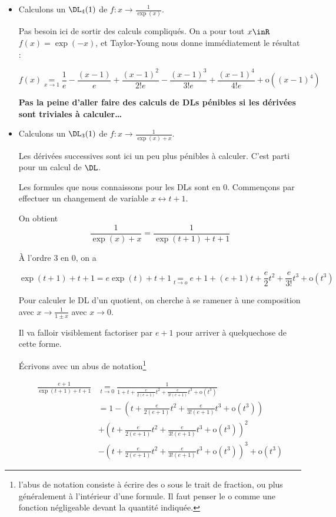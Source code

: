 \documentclass[12pt]{article}
\begin{document}
\begin{itemize}

\item Calculons un $\DL_4(1)$ de $f:x\rightarrow \frac{1}{\exp(x)}$.

Pas besoin ici de sortir des calculs compliqués. On a pour tout $x\inR$
$f(x)=\exp(-x)$, et Taylor-Young nous donne immédiatement le résultat :

$$f(x)\underset{x\rightarrow 1}{=} \frac{1}{e} - \frac{(x-1)}{e} +
\frac{(x-1)^2}{2! e}
- \frac{(x-1)^3}{3! e} +  \frac{(x-1)^4}{4! e} + \text{o}((x-1)^4) $$

\textbf{Pas la peine d'aller faire des calculs de DLs pénibles si les
  dérivées sont triviales à calculer\dots}

\item Calculons un $\DL_3(1)$ de $f:x\rightarrow \frac{1}{\exp(x)+x}$.

Les dérivées successives sont ici un peu plus pénibles à calculer. C'est
parti pour un calcul de $\DL$.

Les formules que nous connaissons pour les DLs sont en $0$. Commençons par
effectuer un changement de variable $x \leftrightarrow t+1$.

On obtient $$\frac{1}{\exp(x)+x}=\frac{1}{\exp(t+1)+t+1} $$ 

À l'ordre 3 en 0, on a 

$$\exp(t+1)+t+1=e\exp(t)+t+1\underset{t\rightarrow o}{=} e+1 +(e+1)t
+\frac{e}{2} t^2 + \frac{e}{3!} t^3 + \text{o}(t^3) $$

Pour calculer le DL d'un quotient, on cherche à se ramener à une
composition avec $x\rightarrow \frac{1}{1\pm x}$ avec $x\rightarrow 0$.

Il va falloir visiblement factoriser par $e+1$ pour arriver à quelquechose
de cette forme.

Écrivons avec un abus de notation\footnote{l'abus de notation consiste à
  écrire des $\text{o}$ sous le trait de fraction, ou plus généralement à
  l'intérieur d'une formule. Il faut penser le $\text{o}$ comme une
  fonction négligeable devant la quantité indiquée.}

\begin{align*}
\frac{e+1}{\exp(t+1)+t+1} &\underset{t\rightarrow 0}{=}  \frac{1}{1+t +\frac{e}{2(e+1)} t^2
  + \frac{e}{3!(e+1)} t^3 + \text{o}(t^3)}\\
&= 1- (t +\frac{e}{2(e+1)} t^2 + \frac{e}{3!(e+1)} t^3 +
  \text{o}(t^3)) \\&+  (t +\frac{e}{2(e+1)} t^2
  + \frac{e}{3!(e+1)} t^3 + \text{o}(t^3))^2 \\&- (t +\frac{e}{2(e+1)} t^2
  + \frac{e}{3!(e+1)} t^3 + \text{o}(t^3))^3 + \text{o}(t^3)
\end{align*}


\end{itemize}
\end{document}
